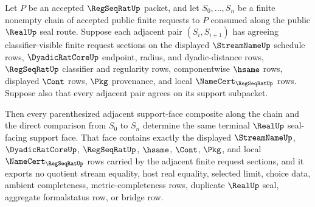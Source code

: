 \begin{theorem}
\label{thm:regseqrat-finite-request-support-face-chain-induction}
Let $P$ be an accepted $\RegSeqRatUp$ packet, and let
$S_0,\ldots,S_n$ be a finite nonempty chain of accepted public finite requests
to $P$ consumed along the public $\RealUp$ seal route. Suppose each adjacent
pair $(S_i,S_{i+1})$ has agreeing classifier-visible finite request sections
on the displayed $\StreamNameUp$ schedule rows, $\DyadicRatCoreUp$ endpoint,
radius, and dyadic-distance rows, $\RegSeqRatUp$ classifier and regularity
rows, componentwise $\hsame$ rows, displayed $\Cont$ rows, $\Pkg$ provenance,
and local $\NameCert_{\RegSeqRatUp}$ rows. Suppose also that every adjacent
pair agrees on its support subpacket.

Then every parenthesized adjacent support-face composite along the chain and
the direct comparison from $S_0$ to $S_n$ determine the same terminal
$\RealUp$ seal-facing support face. That face contains exactly the displayed
$\StreamNameUp$, $\DyadicRatCoreUp$, $\RegSeqRatUp$, $\hsame$, $\Cont$,
$\Pkg$, and local $\NameCert_{\RegSeqRatUp}$ rows carried by the adjacent
finite request sections, and it exports no quotient stream equality, host real
equality, selected limit, choice data, ambient completeness,
metric-completeness rows, duplicate $\RealUp$ seal, aggregate formalstatus
row, or bridge row.
\end{theorem}
